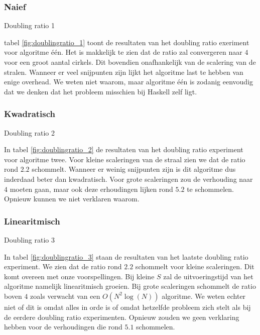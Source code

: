 \subsubsection{Naief}
\begin{table}[H]

\caption{Doubling ratio 1}
\label{fig:doublingratio_1}
\end{table}
tabel \ref{fig:doublingratio_1} toont de resultaten van het doubling ratio exeriment voor algoritme \'e\'en. Het is makkelijk te zien dat de ratio zal convergeren naar $4$ voor een groot aantal cirkels. Dit bovendien onafhankelijk van de scalering van de stralen. Wanneer er veel snijpunten zijn lijkt het algoritme last te hebben van enige overhead. We weten niet waarom, maar algoritme \'e\'en is zodanig eenvoudig dat we denken dat het probleem misschien bij Haskell zelf ligt.


\subsubsection{Kwadratisch}
\begin{table}[H]

\caption{Doubling ratio 2}
\label{fig:doublingratio_2}
\end{table}
In tabel \ref{fig:doublingratio_2} de resultaten van het doubling ratio experiment voor algoritme twee. Voor kleine scaleringen van de straal zien we dat de ratio rond $2.2$ schommelt. Wanneer er weinig snijpunten zijn is dit algoritme dus inderdaad beter dan kwadratisch.
Voor grote scaleringen zou de verhouding naar $4$ moeten gaan, maar ook deze erhoudingen lijken rond $5.2$ te schommelen. Opnieuw kunnen we niet verklaren waarom.

\subsubsection{Linearitmisch}
\begin{table}[h]

\caption{Doubling ratio 3}
\label{fig:doublingratio_3}
\end{table}
In tabel \ref{fig:doublingratio_3} staan de resultaten van het laatste doubling ratio experiment.
We zien dat de ratio rond $2.2$ schommelt voor kleine scaleringen.
Dit komt overeen met onze voorspellingen.
Bij kleine $S$ zal de uitvoeringstijd van het algoritme namelijk linearitmisch groeien.
Bij grote scaleringen schommelt de ratio boven $4$ zoals verwacht van een $O(N^2\log(N))$ algoritme. We weten echter niet of dit is omdat alles in orde is of omdat hetzelfde probleem zich stelt als bij de eerdere doubling ratio experimenten. Opnieuw zouden we geen verklaring hebben voor de verhoudingen die rond $5.1$ schommelen.

